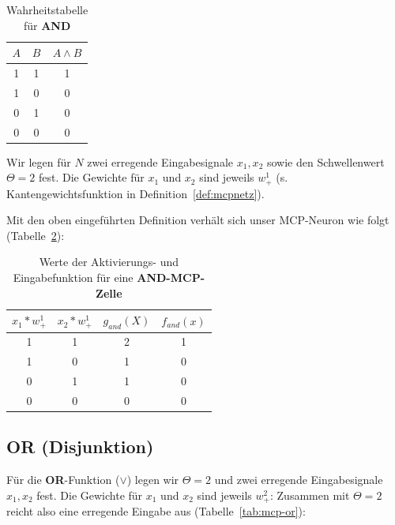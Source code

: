 \setlength{\tabcolsep}{1.5em}
{\renewcommand{\arraystretch}{1.5}%
\begin{table} %
    \centering
    \begin{tabular}{c | c | c }
        \textbf{$A$} & \textbf{$B$} & \textbf{$A \land B$} \\
        \hline
        1  & 1 & 1 \\
        1  & 0 & 0 \\
        0  & 1 & 0 \\
        0  & 0 & 0 \\
    \end{tabular}
    \caption{Wahrheitstabelle für \textbf{AND}}
    \label{tab:and}
\end{table}



Wir legen für $N$ zwei erregende Eingabesignale $x_1, x_2$ sowie den Schwellenwert $\Theta = 2$ fest. Die Gewichte für $x_1$ und $x_2$ sind jeweils $w^1_+$ (s. Kantengewichtsfunktion in Definition~\ref{def:mcpnetz}).

Mit den oben eingeführten Definition verhält sich unser MCP-Neuron wie folgt (Tabelle~\ref{tab:mcp-and}):

\begin{table} %
    \centering
    \begin{tabular}{c | c | c |c }
        $x_1*w^1_+$ & $x_2*w^1_+$ & $g_{and}(X)$ & $f_{and}(x)$ \\
        \hline
        1     & 1     & 2      &   1   \\
        1     & 0     & 1      &   0   \\
        0     & 1     & 1      &   0   \\
        0     & 0     & 0      &   0   \\
    \end{tabular}
    \caption{Werte der Aktivierungs- und Eingabefunktion für eine \textbf{AND-MCP-Zelle}}
    \label{tab:mcp-and}
\end{table}


\subsection*{OR (Disjunktion)}

Für die \textbf{OR}-Funktion ($\lor$) legen wir $\Theta = 2$ und zwei erregende Eingabesignale $x_1, x_2$ fest. Die Gewichte für $x_1$ und $x_2$ sind jeweils $w^2_+$: Zusammen mit $\Theta = 2$ reicht also eine erregende Eingabe aus (Tabelle~\ref{tab:mcp-or}):


}
